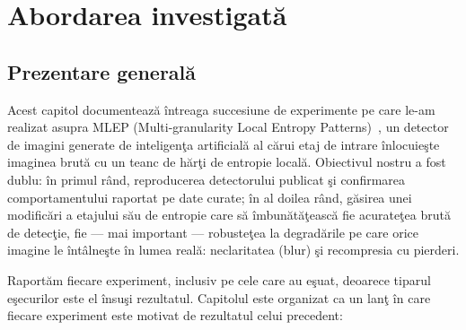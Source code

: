 %
%
\chapter{Abordarea investigată}
\label{chapter:proposedApproach}

\section{Prezentare generală}
\label{sec:overview}

Acest capitol documentează întreaga succesiune de experimente pe care le-am
realizat asupra MLEP (Multi-granularity Local Entropy Patterns)~\cite{yuan2025mlep},
un detector de imagini generate de inteligenţa artificială al cărui etaj de
intrare înlocuieşte imaginea brută cu un teanc de hărţi de entropie locală.
Obiectivul nostru a fost dublu: în primul rând, reproducerea detectorului
publicat şi confirmarea comportamentului raportat pe date curate; în al doilea
rând, găsirea unei modificări a etajului său de entropie care să îmbunătăţească
fie acurateţea brută de detecţie, fie --- mai important --- robusteţea la
degradările pe care orice imagine le întâlneşte în lumea reală: neclaritatea
(blur) şi recompresia cu pierderi.

Raportăm fiecare experiment, inclusiv pe cele care au eşuat, deoarece tiparul
eşecurilor este el însuşi rezultatul. Capitolul este organizat ca un lanţ în
care fiecare experiment este motivat de rezultatul celui precedent:

